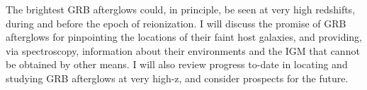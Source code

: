 


\bigskip



\bigskip

\noindent The brightest GRB afterglows could, in principle, be seen at very high redshifts, during and before the epoch of reionization.  I will discuss the promise of GRB afterglows for pinpointing the locations of their faint host galaxies, and providing, via spectroscopy, information about their environments and the IGM that cannot be obtained by other means.  I will also review progress to-date in locating and studying GRB afterglows at very high-z, and consider prospects for the future.

